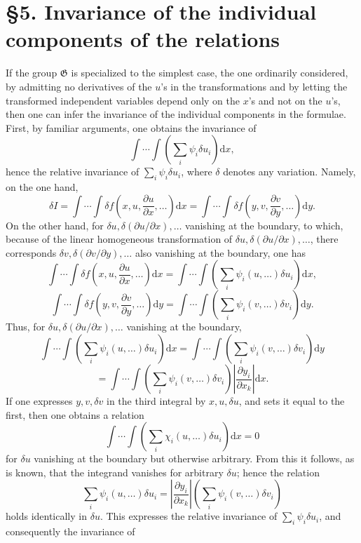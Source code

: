 \documentclass[11pt]{article}
\providecommand{\dd}{\mathrm d}
\providecommand{\G}{\mathfrak G}
\providecommand{\p}{\partial}
\providecommand{\p}{\partial}
\providecommand{\dd}{\mathrm d}
\begin{document}
\section*{\S{}5. Invariance of the individual components of the relations}

If the group \(\G\) is specialized to the simplest case, the one ordinarily considered, by admitting no derivatives of the \(u\)'s in the transformations and by letting the transformed independent variables depend only on the \(x\)'s and not on the \(u\)'s, then one can infer the invariance of the individual components in the formulae. First, by familiar arguments, one obtains the invariance of
\[
\int\!\cdots\!\int\left(\sum_i\psi_i\delta u_i\right)\dd x,
\]
hence the relative invariance of \(\sum_i\psi_i\delta u_i\), where \(\delta\) denotes any variation. Namely, on the one hand,
\[
\delta I
=\int\!\cdots\!\int \delta f\!\left(x,u,\frac{\p u}{\p x},\ldots\right)\dd x
=\int\!\cdots\!\int \delta f\!\left(y,v,\frac{\p v}{\p y},\ldots\right)\dd y.
\]
On the other hand, for \(\delta u,\delta(\p u/\p x),\ldots\) vanishing at the boundary, to which, because of the linear homogeneous transformation of \(\delta u,\delta(\p u/\p x),\ldots\), there corresponds \(\delta v,\delta(\p v/\p y),\ldots\) also vanishing at the boundary, one has
\[
\int\!\cdots\!\int \delta f\!\left(x,u,\frac{\p u}{\p x},\ldots\right)\dd x
=
\int\!\cdots\!\int\left(\sum_i\psi_i(u,\ldots)\delta u_i\right)\dd x,
\]
\[
\int\!\cdots\!\int \delta f\!\left(y,v,\frac{\p v}{\p y},\ldots\right)\dd y
=
\int\!\cdots\!\int\left(\sum_i\psi_i(v,\ldots)\delta v_i\right)\dd y.
\]
Thus, for \(\delta u,\delta(\p u/\p x),\ldots\) vanishing at the boundary,
\[
\int\!\cdots\!\int\left(\sum_i\psi_i(u,\ldots)\delta u_i\right)\dd x
=
\int\!\cdots\!\int\left(\sum_i\psi_i(v,\ldots)\delta v_i\right)\dd y
\]
\[
=
\int\!\cdots\!\int\left(\sum_i\psi_i(v,\ldots)\delta v_i\right)
\left|\frac{\p y_i}{\p x_k}\right|\dd x.
\]
If one expresses \(y,v,\delta v\) in the third integral by \(x,u,\delta u\), and sets it equal to the first, then one obtains a relation
\[
\int\!\cdots\!\int\left(\sum_i\chi_i(u,\ldots)\delta u_i\right)\dd x=0
\]
for \(\delta u\) vanishing at the boundary but otherwise arbitrary. From this it follows, as is known, that the integrand vanishes for arbitrary \(\delta u\); hence the relation
\[
\sum_i\psi_i(u,\ldots)\delta u_i
=
\left|\frac{\p y_i}{\p x_k}\right|
\left(\sum_i\psi_i(v,\ldots)\delta v_i\right)
\]
holds identically in \(\delta u\). This expresses the relative invariance of \(\sum_i\psi_i\delta u_i\), and consequently the invariance of
\end{document}
